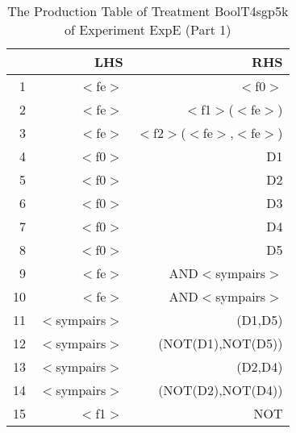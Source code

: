 \begin{table}[ht]
\centering
\begin{tabular}{rrr}
  \hline
 & LHS & RHS \\ 
  \hline
1 & $<$fe$>$ & $<$f0$>$ \\ 
  2 & $<$fe$>$ & $<$f1$>$($<$fe$>$) \\ 
  3 & $<$fe$>$ & $<$f2$>$($<$fe$>$,$<$fe$>$) \\ 
  4 & $<$f0$>$ & D1 \\ 
  5 & $<$f0$>$ & D2 \\ 
  6 & $<$f0$>$ & D3 \\ 
  7 & $<$f0$>$ & D4 \\ 
  8 & $<$f0$>$ & D5 \\ 
  9 & $<$fe$>$ & AND$<$sympairs$>$ \\ 
  10 & $<$fe$>$ & AND$<$sympairs$>$ \\ 
  11 & $<$sympairs$>$ & (D1,D5) \\ 
  12 & $<$sympairs$>$ & (NOT(D1),NOT(D5)) \\ 
  13 & $<$sympairs$>$ & (D2,D4) \\ 
  14 & $<$sympairs$>$ & (NOT(D2),NOT(D4)) \\ 
  15 & $<$f1$>$ & NOT \\ 
   \hline
\end{tabular}
\caption{The Production Table of Treatment BoolT4sgp5k of Experiment ExpE (Part 1)} 
\end{table}
